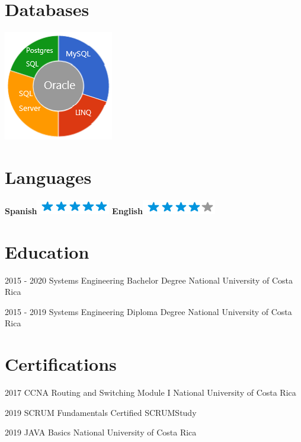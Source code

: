 \documentclass[]{friggeri-cv}
\begin{document}
\begin{aside}
  \section{Databases}
    \includegraphics[scale=0.62]{img/DB.png}
    ~
   \section{Languages}
    \textbf{Spanish}\includegraphics[scale=0.40]{img/5stars.png}
    \textbf{English}\includegraphics[scale=0.40]{img/4stars.png}
\end{aside}

\section{Education}
\begin{entrylist}
  \entry
    {2015 - 2020}
    {Systems Engineering Bachelor Degree}
    {National University of Costa Rica}
    
  \entry
    {2015 - 2019}
    {Systems Engineering Diploma Degree}
    {National University of Costa Rica}
    
\end{entrylist}

\section{Certifications}
\begin{entrylist}
  \entry
    {2017}
    {CCNA Routing and Switching Module I}
    {National University of Costa Rica}
    
    \entry
    {2019}
    {SCRUM Fundamentals Certified}
    {SCRUMStudy}
    
    \entry
    {2019}
    {JAVA Basics}
    {National University of Costa Rica}
    
\end{entrylist}
\end{document}

